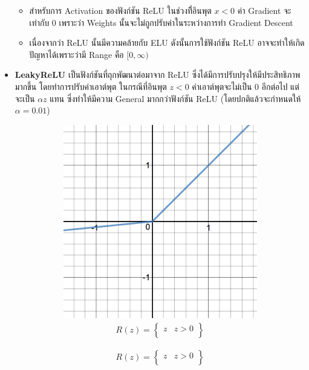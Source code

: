 \begin{itemize}
\begin{itemize}
        \item สำหรับการ Activation ของฟังก์ชัน ReLU ในช่วงที่ิอินพุต $x < 0$ ค่า Gradient จะเท่ากับ 0 เพราะว่า Weights 
        นั้นจะไม่ถูกปรับค่าในระหว่างการทำ Gradient Descent

        \item เนื่องจากว่า ReLU นั้นมีความคล้ายกับ ELU ดังนั้นการใช้ฟังก์ชัน ReLU อาจจะทำให้เกิดปัญหาได้เพราะว่ามี Range คือ 
        $[0,\infty)$
    \end{itemize}

    \item \textbf{LeakyReLU}\autocite{he2015} เป็นฟังก์ชันที่ถุกพัฒนาต่อมาจาก ReLU ซึ่งได้มีการปรับปรุงให้มีประสิทธิภาพมากขึ้น%
    โดยทำการปรับค่าเอาต์พุต ในกรณีที่อินพุต $z < 0$ ค่าเอาต์พุตจะไม่เป็น 0 อีกต่อไป แต่จะเป็น $\alpha z$ แทน ซึ่งทำให้มีความ General 
    มากกว่าฟังก์ชัน ReLU (โดยปกติแล้วจะกำหนดให้ $\alpha = 0.01$)
    \begin{figure}[htbp]
        \centering
        \begin{subfigure}{0.5\textwidth}
            \centering
            \includegraphics[width=0.9\linewidth]{fig/actfunc_leakyrelu.png}
            \caption{%
                \begin{equation}
                    \begin{split}R(z) = \begin{Bmatrix} z & z > 0 \\

\end{Bmatrix}
\end{split}
\end{equation}}
\end{subfigure}
\end{figure}
\end{itemize}
